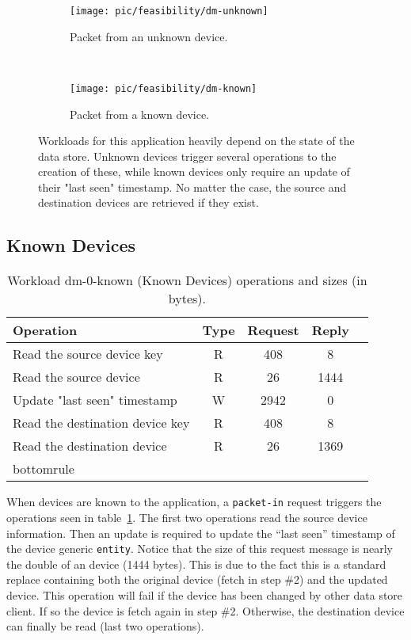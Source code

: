 \begin{figure}
  \centering
  \begin{subfigure}[b]{0.5\textwidth}
                \centering
                \texttt{[image: pic/feasibility/dm-unknown]}
                \caption{Packet from an unknown device.}
                \label{fig:dm:interaction:unknown}
        \end{subfigure}%
        ~
        \begin{subfigure}[b]{0.5\textwidth}
                \centering
                \texttt{[image: pic/feasibility/dm-known]}
                \caption{Packet from a known device.}
                \label{fig:dm:interaction:known}
        \end{subfigure}
        \caption[Device Manager workload events]{Workloads for this application heavily depend on the state of the data store. Unknown devices trigger several operations to the creation of these, while known devices only require an update of their "last seen" timestamp. No matter the case, the source and destination devices are retrieved if they exist.}
        \label{fig:dm:interaction}
\end{figure}

\subsection{Known Devices}

\begin{table}[ht]
\small
\centering 
\begin{tabular}{l c c c c}
Operation & Type & Request & Reply \\ \toprule 
Read the source device key & R & 408 & 8\\
Read the source device & R & 26 & 1444\\
Update "last seen" timestamp & W & 2942 & 0\\
Read the destination device key & R & 408 & 8\\
Read the destination device & R & 26 & 1369 \\bottomrule 
\end{tabular}
\caption[Workload dm-0-known (Known Devices) operations]{Workload
  dm-0-known (Known Devices) operations and sizes (in bytes).}
\label{table:ops:dm-0-known}
\end{table}

When devices are known to the application, a \texttt{packet-in} request
triggers the operations seen in table~\ref{table:ops:dm-0-known}. The
first two operations read the source device information. 
Then an update is required to update the ``last seen'' timestamp of the device generic \texttt{entity}. 
Notice that the size of this request message is nearly the double of an device (1444 bytes). 
This is due to the fact this is a standard replace  containing both the original device (fetch in step \#2) and the updated device. 
This operation will fail if the device has been changed by other data store client. If so the device is fetch again in step \#2. 
Otherwise, the destination device can  finally be read (last two operations). 

